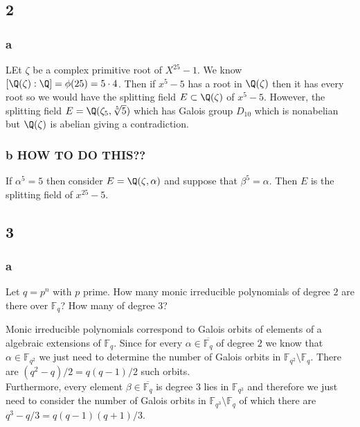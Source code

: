 \documentclass[12pt]{article}
\renewcommand{\F}{\mathbb{F}}
\begin{document}
\subsection{2}

\subsubsection{a}

LEt $\zeta$ be a complex primitive root of $X^{25} - 1$. We know $[\Q(\zeta) : \Q] = \phi(25) = 5 \cdot 4$. Then if $x^5 - 5$ has a root in $\Q(\zeta)$ then it has every root so we would have the splitting field $E \subset \Q(\zeta)$ of $x^5 - 5$. However, the splitting field $E = \Q(\zeta_5, \sqrt[5]{5})$ which has Galois group $D_{10}$ which is nonabelian but $\Q(\zeta)$ is abelian giving a contradiction. 

\subsubsection{b HOW TO DO THIS??}

If $\alpha^5 = 5$ then consider $E = \Q(\zeta, \alpha)$ and suppose that $\beta^5 = \alpha$. Then $E$ is the splitting field of $x^{25} - 5$. 

\subsection{3}

\subsubsection{a}

\begin{exercise}
Let $q = p^n$ with $p$ prime. How many monic irreducible polynomials of degree $2$ are there over $\F_q$? How many of degree $3$?
\end{exercise}

Monic irreducible polynomials correspond to Galois orbits of elements of a algebraic extensions of $\F_q$. Since for every $\alpha \in \overline{\F_q}$ of degree $2$ we know that $\alpha \in \F_{q^2}$ we just need to determine the number of Galois orbits in $\F_{q^2} \setminus \F_q$. There are $(q^2 - q)/2 = q(q-1)/2$ such orbits. 
\bigskip\\
Furthermore, every element $\beta \in \overline{\F_q}$ is degree $3$ lies in $\F_{q^3}$ and therefore we just need to consider the number of Galois orbits in $\F_{q^3} \setminus \F_{q}$ of which there are $q^3 - q / 3 = q(q-1)(q+1)/3$.
\end{document}
